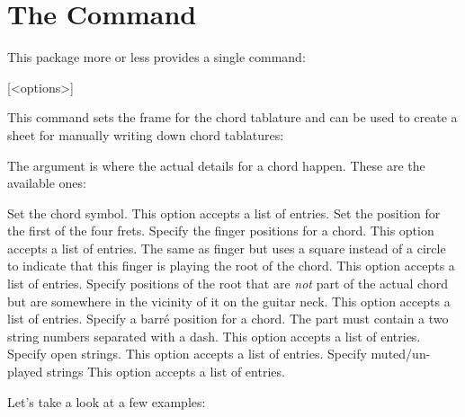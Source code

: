 \documentclass[toc=index,toc=bib]{cnpkgdoc}
\begin{document}
\section{The Command}
This package more or less provides a single command:
\begin{beschreibung}
 [<options>]
\end{beschreibung}
This command sets the frame for the chord tablature and can be used to create
a sheet for manually writing down chord tablatures:
\begin{beispiel}
 \chordscheme
\end{beispiel}
The  argument is where the actual details for a chord happen. These
are the available ones:
\begin{beschreibung}
 \newline
   Set the chord symbol. This option accepts a list of entries.
 \newline
   Set the position for the first of the four frets.
 \newline
   Specify the finger positions for a chord. This option accepts a list of entries.
 \newline
   The same as finger but uses a square instead of a circle to indicate that
   this finger is playing the root of the chord. This option accepts a list of
   entries.
 \newline
   Specify positions of the root that are \emph{not} part of the actual chord
   but are somewhere in the vicinity of it on the guitar neck. This option
   accepts a list of entries.
 \newline
   Specify a barr\'e position for a chord. The  part must
   contain a two string numbers separated with a dash. This option accepts a list
   of entries.
 \newline
   Specify open strings. This option accepts a list of entries.
 \newline
   Specify muted/un-played strings This option accepts a list of entries.
\end{beschreibung}

Let's take a look at a few examples:

\begin{beispiel}
 \chordscheme[
   name      = G ,
   position  = I ,
   finger    = {2/5/1} ,
   root      = {3/6/2, 3/1/4} ,
   ring      = {2,3,4}
 ]
\end{beispiel}
\end{document}
